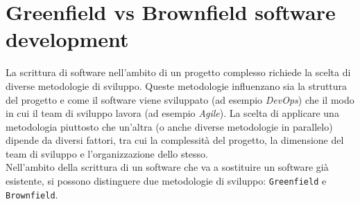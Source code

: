 \chapter{Greenfield vs Brownfield software development}
\label{ch:greenfield_vs_brownfield}
La scrittura di software nell'ambito di un progetto complesso richiede la scelta di diverse metodologie di sviluppo.
Queste metodologie influenzano sia la struttura del progetto e come il software viene sviluppato (ad esempio \textit{DevOps}) 
che il modo in cui il team di sviluppo lavora (ad esempio \textit{Agile}).
La scelta di applicare una metodologia piuttosto che un'altra (o anche diverse metodologie in parallelo) dipende da diversi fattori, tra cui la complessità del progetto,
la dimensione del team di sviluppo e l'organizzazione dello stesso.\\
Nell'ambito della scrittura di un software che va a sostituire un software già esistente, si possono distinguere due metodologie di sviluppo: \texttt{Greenfield} e \texttt{Brownfield}.

